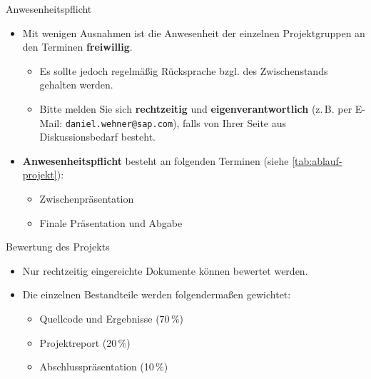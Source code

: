 \begin{dwHeaderFrame}{Anwesenheitspflicht}
	\begin{itemize}
		\item Mit wenigen Ausnahmen ist die Anwesenheit der einzelnen Projektgruppen an den Terminen \textbf{freiwillig}.
		\begin{itemize}
			\item Es sollte jedoch regelmäßig Rücksprache bzgl. des Zwischenstands gehalten werden.
			\item Bitte melden Sie sich \textbf{rechtzeitig} und \textbf{eigenverantwortlich} (z.\,B. per E-Mail: \texttt{daniel.wehner@sap.com}), falls von Ihrer Seite aus Diskussionsbedarf besteht.
		\end{itemize}
		\item \textbf{Anwesenheitspflicht} besteht an folgenden Terminen (siehe \cref{tab:ablauf-projekt}):
		\begin{itemize}
			\item Zwischenpräsentation
			\item Finale Präsentation und Abgabe
		\end{itemize}
	\end{itemize}
\end{dwHeaderFrame}


\begin{dwHeaderFrame}{Bewertung des Projekts}
	\begin{itemize}
		\item Nur rechtzeitig eingereichte Dokumente können bewertet werden.
		\item Die einzelnen Bestandteile werden folgendermaßen gewichtet:
		\begin{itemize}
			\item Quellcode und Ergebnisse (70\,\%)
			\item Projektreport (20\,\%)
			\item Abschlusspräsentation (10\,\%)
		\end{itemize}
	\end{itemize}

\end{dwHeaderFrame}


